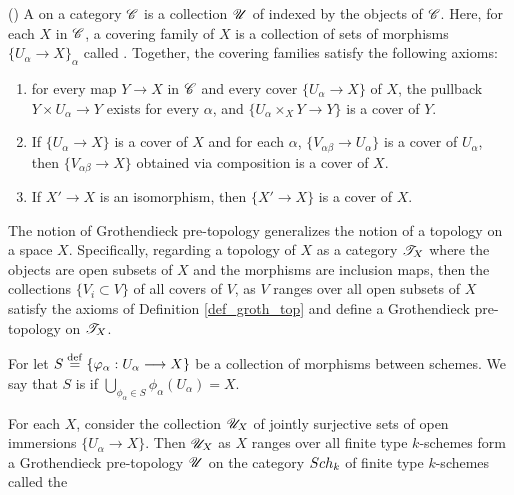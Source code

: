 \begin{defn}\label{def_groth_top} (\cite[II.1.3]{SGA4})
A  on a category $\mathscr{C}$ is a
collection $\mathscr{U}$ of  indexed by the objects
of $\mathscr{C}$. Here, for each $X$ in $\mathscr{C}$, a covering family of
$X$ is a collection of sets of morphisms $\{U_\alpha \to X\}_\alpha$
called . Together, the covering families satisfy
the following axioms:

\begin{enumerate}
\item for every map $Y \to X$ in $\mathscr{C}$ and every cover 
$\{U_\alpha \to X\}$ of $X$, the pullback $Y \times U_\alpha \to 
Y$ exists for every $\alpha$, and $\{U_\alpha \times_X Y \to Y\}$ 
is a cover of $Y$.

\item If $\{U_\alpha \to X\}$ is a cover of $X$ and for each 
$\alpha$, $\{V_{\alpha\beta} \to U_\alpha\}$ is a cover of 
$U_\alpha$, then $\{V_{\alpha\beta} \to X\}$ obtained via 
composition is a cover of $X$.

\item If $X' \to X$ is an isomorphism, then $\{X' \to X\}$ is a 
cover of $X$.
\end{enumerate}
\end{defn}

\begin{rmk}
The notion of Grothendieck pre-topology generalizes the notion of a
topology on a space $X$. Specifically, regarding a topology of $X$ as
a category $\mathscr{T}_X$ where the objects are open subsets of $X$ and
the morphisms are inclusion maps, then the collections $\{V_i
\subset V\}$ of all covers of $V$, as $V$ ranges over all open 
subsets of $X$ satisfy the axioms of Definition \ref{def_groth_top} and 
define a Grothendieck pre-topology on $\mathscr{T}_X$.
\end{rmk}

\begin{defn}
For let $S \stackrel{\mathrm{def}}{=} \{\varphi_\alpha: U_\alpha \longrightarrow X\}$ be a collection 
of morphisms between schemes. We say that $S$ is  if $\bigcup_{\phi_\alpha \in S} \phi_\alpha(U_\alpha)
= X$.
\end{defn}

\begin{rmk}
For each $X$, consider the collection $\mathscr{U}_X$ of jointly 
surjective sets of open immersions $\{U_\alpha \to X\}$. Then
$\mathscr{U}_X$ as $X$ ranges over all finite type $k$-schemes 
form a Grothendieck pre-topology $\mathscr{U}$ on the category 
$Sch_k$ of finite type $k$-schemes called the 
\end{rmk}

